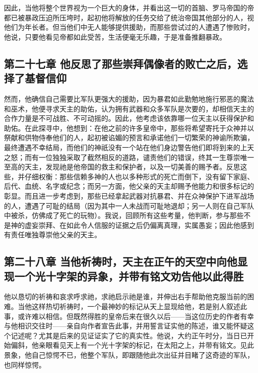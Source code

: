 因此，当他将整个世界视为一个巨大的身体，并看出这一切的首脑、罗马帝国的帝都已被暴政压迫所压垮时，起初他将解放的任务交给了统治帝国其他部分的人，视他们为年长者。但当他们中无人能够提供援助，而那些尝试过的人遭遇了惨败时，他说，只要他看见帝都如此受苦，生活便毫无乐趣，于是准备推翻暴政。\par


\subsection{第二十七章 他反思了那些崇拜偶像者的败亡之后，选择了基督信仰}

然而，他确信自己需要比军队更强大的援助，因为暴君如此勤勉地施行邪恶的魔法和巫术，他便寻求天主的助佑，认为拥有武器和众多军队是次要的，却相信天主的合作力量是不可战胜、不可动摇的。因此，他考虑该依靠哪一位天主以获得保护和助佑。在此探寻中，他想到：在他之前的许多皇帝中，那些将希望寄托于众神并以祭献和供物侍奉他们的人，起初被谄媚的预言和承诺他们一切繁荣的神谕所欺骗，最终遭遇不幸结局，而他们的神祇没有一个站在他们身边警告他们即将到来的上天之怒；而有一位独独采取了截然相反的道路，谴责他们的错误，终其一生尊崇唯一至高的天主，发现祂是他帝国的救主和保护者，以及一切美善的赐予者。反思这些，并仔细权衡：那些信赖多神的人也以多种形式的死亡而倒下，没有留下家庭、后代、血统、名字或纪念；而另一方面，他父亲的天主却赐予他能力和很多标记的彰显。而且进一步考虑到，那些已经拿起武器对抗暴君、并在众神保护下进军战场的人，遭遇了可耻的结局（因为其中一人未战而可耻地退却；另一人则在自己军队中被杀，仿佛成了死亡的玩物）。我说，回顾所有这些考量，他判断，参与那些不是神的虚妄崇拜、在如此令人信服的证据之后仍偏离真理，实属愚妄；因此他感到有责任唯独尊崇他父亲的天主。\par


\subsection{第二十八章 当他祈祷时，天主在正午的天空中向他显现一个光十字架的异象，并带有铭文劝告他以此得胜}

他以恳切的祈祷和哀求呼求祂，求祂启示祂是谁，并伸出右手帮助他克服当前的困难。当他这样热切祈祷时，一个最神妙的标记从天上显现给他，若是别人叙述此事，或许难以相信。但既然得胜的皇帝后来在很久以后——当这位历史的作者有幸与他相识交往时——亲自向作者宣告此事，并用誓言证实他的陈述，谁又能怀疑这个记述呢？尤其是后来的见证证实了它的真实性。他说，大约正午时分，当日已开始偏斜，他亲眼看见天上有一个光十字架的标记，在太阳之上，并带有铭文。见此景象，他自己惊愕不已，他整个军队，即跟随他此次出征并目睹了这奇迹的军队，也同样惊愕。\par

